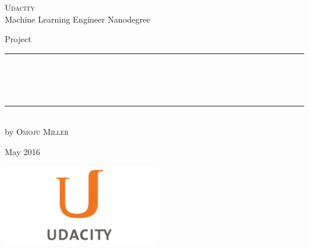 
\begin{titlepage}
    \begin{addmargin}[-1cm]{-3cm}
    \begin{center}
        \large
        {\Large \textsc{Udacity}}\\[1ex]
        Machine Learning Engineer Nanodegree\\
       

        \vfill

        Project\\ \vskip1cm
        \rule{14cm}{0.4pt}\\ \bigskip
        \begingroup
            \Large
            \color{Maroon}\spacedallcaps{\myTitle} \\ \bigskip
        \endgroup
        \spacedlowsmallcaps{\mySubtitle} \\ \bigskip
        \rule{14cm}{0.4pt}\\ \vskip1cm
        by \textsc{Omoju Miller}

        \vfill
        \vfill
        \vfill

       
        \hfill May 2016
    \end{center}
    \vspace{-3.5cm}
    \includegraphics[width=0.50\textwidth]{images/udacity_logo}
  \end{addmargin}
\end{titlepage}
